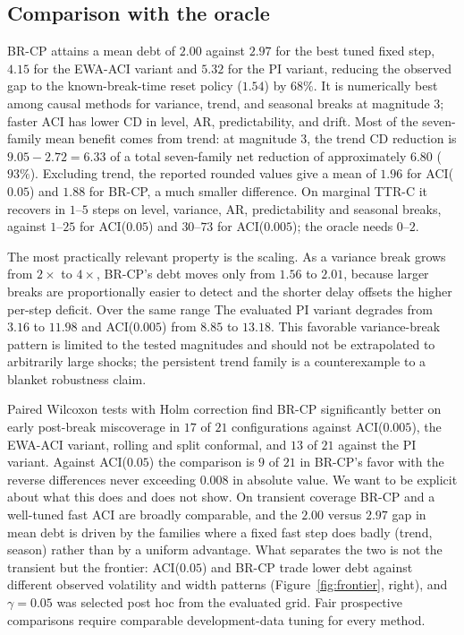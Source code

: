 \documentclass[10pt]{article}
\newcommand{\brcp}{\textsc{BR-CP}}
\begin{document}
\subsection{Comparison with the oracle}

\brcp{} attains a mean debt of $2.00$ against $2.97$ for the best tuned fixed
step, $4.15$ for the EWA-ACI variant and $5.32$ for the PI variant, reducing the observed gap to the known-break-time reset policy ($1.54$) by $68\%$. It is numerically best among causal methods for variance, trend, and seasonal breaks at magnitude 3; faster ACI has lower CD in level, AR, predictability, and drift. Most of the seven-family mean benefit comes from trend: at magnitude 3, the trend CD reduction is $9.05-2.72=6.33$ of a total seven-family net reduction of approximately $6.80$ ($93\%$). Excluding trend, the reported rounded values give a mean of $1.96$ for ACI($0.05$) and $1.88$ for BR-CP, a much smaller difference. On marginal TTR-C it recovers in
$1$--$5$ steps on level, variance, AR, predictability and seasonal breaks,
against $1$--$25$ for ACI($0.05$) and $30$--$73$ for ACI($0.005$); the oracle
needs $0$--$2$.

The most practically relevant property is the scaling. As a variance break
grows from $2\times$ to $4\times$, \brcp{}'s debt moves only from $1.56$ to
$2.01$, because larger breaks are proportionally easier to detect and the
shorter delay offsets the higher per-step deficit. Over the same range
The evaluated PI variant degrades from $3.16$ to $11.98$ and ACI($0.005$) from $8.85$ to
$13.18$. This favorable variance-break pattern is limited to the tested magnitudes and should not be extrapolated to arbitrarily large shocks; the persistent trend family is a counterexample to a blanket robustness claim.

Paired Wilcoxon tests with Holm correction find \brcp{} significantly better on
early post-break miscoverage in $17$ of $21$ configurations against
ACI($0.005$), the EWA-ACI variant, rolling and split conformal, and $13$ of $21$ against
the PI variant. Against ACI($0.05$) the comparison is $9$ of $21$ in \brcp{}'s
favor with the reverse differences never exceeding $0.008$ in absolute value.
We want to be explicit about what this does and does not show. On transient
coverage \brcp{} and a well-tuned fast ACI are broadly comparable, and the
$2.00$ versus $2.97$ gap in mean debt is driven by the families where a fixed
fast step does badly (trend, season) rather than by a uniform advantage. What
separates the two is not the transient but the frontier: ACI($0.05$) and BR-CP trade lower debt against different observed volatility and width patterns
(Figure~\ref{fig:frontier}, right), and $\gamma=0.05$ was selected post hoc from the evaluated grid. Fair prospective comparisons require comparable development-data tuning for every method.
\end{document}

